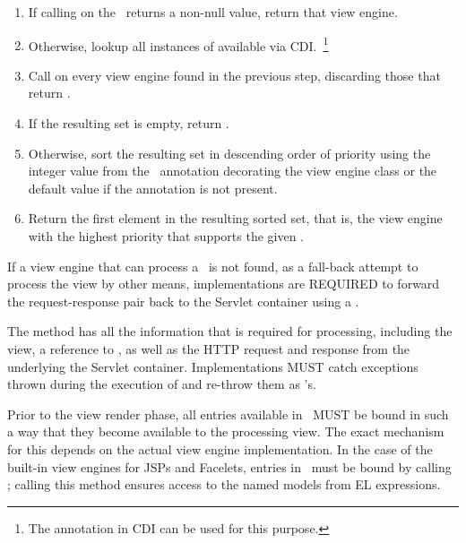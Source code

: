 \begin{enumerate}
\item If calling  on the \Viewable\ returns a non-null value, return
that view engine.
\item Otherwise, lookup all instances of  available via CDI.~\footnote{The  annotation in CDI can be used for this purpose.}
\item Call  on every view engine found in the previous step, discarding
those that return .
\item If the resulting set is empty, return .
\item Otherwise, sort the resulting set in descending order of priority using the integer value 
from the \Priority\ annotation decorating the view engine class or the default value  if the annotation is not present.
\item Return the first element in the resulting sorted set, that is, the view engine with
the highest priority that supports the given \Viewable.
\end{enumerate}

If a view engine that can process a \Viewable\ is not found, as a fall-back attempt to 
process the view by other means, implementations are 
REQUIRED to forward the request-response pair back to the Servlet container using a 
.

The  method has all the information that is required for processing,
including the view, a reference to \Models, as well as the HTTP request and response
 from the underlying the Servlet container. Implementations MUST catch
exceptions thrown during the execution of  and re-throw them as 
's. 

Prior to the view render phase, all entries available in \Models\ MUST be bound in
such a way that they become available to the processing view. The exact mechanism
for this depends on the actual view engine implementation. In the case of the built-in
view engines for JSPs and Facelets, entries in \Models\ must be bound by calling
; calling this method ensures
access to the named models from EL expressions.


